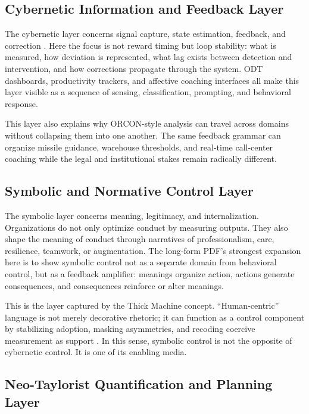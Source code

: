 \documentclass[runningheads]{llncs}
\begin{document}
\subsection{Cybernetic Information and Feedback Layer}

The cybernetic layer concerns signal capture, state estimation, feedback, and correction \cite{wiener1948cybernetics}. Here the focus is not reward timing but loop stability: what is measured, how deviation is represented, what lag exists between detection and intervention, and how corrections propagate through the system. ODT dashboards, productivity trackers, and affective coaching interfaces all make this layer visible as a sequence of sensing, classification, prompting, and behavioral response.

This layer also explains why ORCON-style analysis can travel across domains without collapsing them into one another. The same feedback grammar can organize missile guidance, warehouse thresholds, and real-time call-center coaching while the legal and institutional stakes remain radically different.

\subsection{Symbolic and Normative Control Layer}

The symbolic layer concerns meaning, legitimacy, and internalization. Organizations do not only optimize conduct by measuring outputs. They also shape the meaning of conduct through narratives of professionalism, care, resilience, teamwork, or augmentation. The long-form PDF's strongest expansion here is to show symbolic control not as a separate domain from behavioral control, but as a feedback amplifier: meanings organize action, actions generate consequences, and consequences reinforce or alter meanings.

This is the layer captured by the Thick Machine concept. ``Human-centric'' language is not merely decorative rhetoric; it can function as a control component by stabilizing adoption, masking asymmetries, and recoding coercive measurement as support \cite{geertz1973interpretation,breque2021industry}. In this sense, symbolic control is not the opposite of cybernetic control. It is one of its enabling media.

\subsection{Neo-Taylorist Quantification and Planning Layer}
\end{document}
